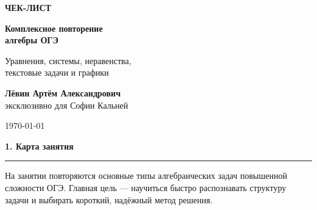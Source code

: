 \documentclass[a4paper,12pt]{article}
\newcommand{\topic}[1]{%
    \vspace{0.5em}
    {\Large\bfseries\textcolor{darkaccent}{#1}}\par
    \vspace{0.2em}
    {\color{accent}\rule{\linewidth}{0.7pt}}
    \vspace{0.5em}
}
\begin{document}

\thispagestyle{empty}

\begin{center}

\vspace*{2.5cm}

{\Large\textcolor{accent}{\textbf{ЧЕК-ЛИСТ}}}

\vspace{0.8cm}

{\huge\bfseries\textcolor{darkaccent}{
Комплексное повторение\\[0.15em]
алгебры ОГЭ
}}

\vspace{0.8cm}

{\large
Уравнения, системы, неравенства,\\
текстовые задачи и графики
}

\vspace{1.7cm}

{\large
\textbf{Лёвин Артём Александрович}\\
эксклюзивно для Софии Кальней
}

\vfill

{\large \today}

\vspace{1.4cm}


\vspace{0.8cm}

\end{center}

\newpage


\topic{1. Карта занятия}

На занятии повторяются основные типы алгебраических задач повышенной сложности ОГЭ. Главная цель --- научиться быстро распознавать структуру задачи и выбирать короткий, надёжный метод решения.
\end{document}
